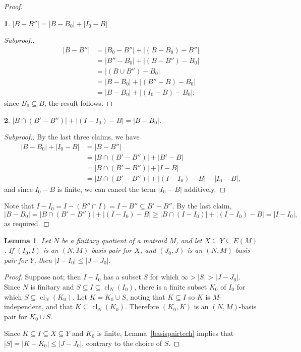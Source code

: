 \documentclass{amsart}
\theoremstyle{plain}
\newtheorem{claim}{}[theorem]
\newtheorem{lemma}[theorem]{Lemma}
\theoremstyle{definition}
\DeclareMathOperator{\cl}{cl}
\renewcommand{\le}{\leqslant}
\renewcommand{\ge}{\geqslant}
\renewcommand{\ss}{\subseteq}
\newenvironment{subproof}[1][\proofname]{%
  \renewcommand{\qedsymbol}{$\blacksquare$}%
  \begin{proof}[Subproof:]%
}{%
  \end{proof}%
}
\begin{document}
\begin{proof}
  \begin{claim}
    $|B-B''| = |B-B_0| + |I_0 - B|$
  \end{claim}
  \begin{subproof}
    \begin{align*}
      |B-B''| &= |B_0 - B''| + |(B - B_0) - B''| \\
      &= |B'' - B_0| + |(B - B'') - B_0| \\ 
      &= |(B \cup B'') - B_0| \\ 
      &= |B - B_0| + |(B'' - B) - B_0| \\ 
      &= |B - B_0| + |(I_0 - B) - B_0|; 
    \end{align*}
    since $B_0 \ss B$, the result follows. 
  \end{subproof}
  \begin{claim}
    $|B \cap (B' - B'')| + |(I - I_0) - B| = |B - B_0|$. 
  \end{claim}
  \begin{subproof}
    By the last three claims, we have 
    \begin{align*}
      |B - B_0| + |I_0 - B| &= |B - B''| \\ 
      &= |B \cap (B' - B'')| + |B' - B| \\ 
      &= |B \cap (B' - B'')| + |I - B| \\ 
      &= |B \cap (B' - B'')| + |(I - I_0) - B| + |I_0 - B|, 
    \end{align*}
    and since $I_0 - B$ is finite, we can cancel the term $|I_0-B|$ additively.
  \end{subproof}
  Note that $I - I_0 = I - (B'' \cap I) = I - B'' \ss B' - B''$. 
  By the last claim, 
  \[|B - B_0| = |B \cap (B' - B'')| + |(I - I_0) - B| \ge |B \cap (I - I_0)| + |(I - I_0)-B|
    = |I - I_0|,\] as required.  
\end{proof}

\begin{lemma}\label{basispairmono}
  Let $N$ be a finitary quotient of a matroid $M$, 
  and let $X \ss Y \ss E(M)$. If $(I_0, I)$ is an $(N,M)$-basis pair for $X$, 
  and $(J_0, J)$ is an $(N,M)$ basis pair for $Y$, then $|I-I_0| \le |J - J_0|$. 
\end{lemma}
\begin{proof}
  Suppose not; then $I-I_0$ has a subset $S$ for which $\infty > |S| > |J-J_0|$.
  Since $N$ is finitary and $S \ss I \ss \cl_N(I_0)$,
  there is a finite subset $K_0$ of $I_0$ for which $S \ss \cl_N(K_0)$. 
  Let $K = K_0 \cup S$, noting that $K \ss I$ so $K$ is $M$-independent, 
  and that $K \ss \cl_N(K_0)$. 
  Therefore $(K_0, K)$ is an $(N,M)$-basis pair for $K_0 \cup S$. 

  Since $K \ss I \ss X \ss Y$ and $K_0$ is finite, Lemma~\ref{basispairtech} implies that 
  $|S| = |K - K_0| \le |J - J_0|$, contrary to the choice of $S$. 
\end{proof}
\end{document}
